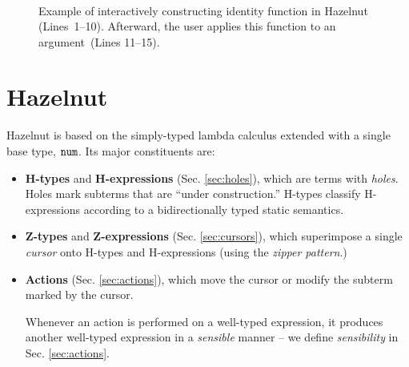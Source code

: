 \documentclass{llncs}
\begin{document}
\begin{figure}[t]
\[\begin{array}{|c||c|c||l|l|}
\end{array}
\]
\caption{Example of interactively constructing identity function in Hazelnut (Lines~1--10).
  Afterward, the user applies this function to an argument~(Lines 11--15).}
\label{fig:first-example}
\end{figure}

\section{Hazelnut}
Hazelnut is based on the simply-typed lambda calculus extended with a single base type, $\texttt{num}$. Its major constituents are:
\begin{itemize}
\item \textbf{H-types} and \textbf{H-expressions} (Sec. \ref{sec:holes}), which are terms with \emph{holes}. Holes mark subterms that are ``under construction.'' H-types classify H-expressions according to a {bidirectionally typed} static semantics.
\item \textbf{Z-types} and \textbf{Z-expressions} (Sec. \ref{sec:cursors}), which superimpose a single \emph{cursor} onto H-types and H-expressions (using the \emph{zipper pattern}.)
\item \textbf{Actions} (Sec. \ref{sec:actions}), which move the cursor or modify the subterm marked by the cursor.

Whenever an action is performed on a well-typed expression, it produces another well-typed expression in a \emph{sensible} manner -- we define \emph{sensibility} in Sec. \ref{sec:actions}.
\end{itemize}
\end{document}
